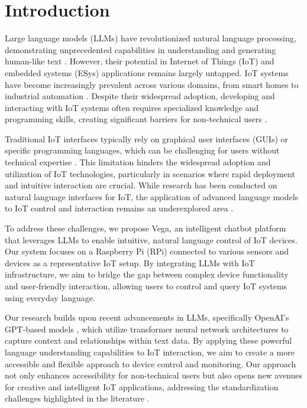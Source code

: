 \documentclass{ieeeaccess}
\begin{document}
\maketitle

\section{Introduction}
\label{sec:introduction}

Large language models (LLMs) have revolutionized natural language processing, demonstrating unprecedented capabilities in understanding and generating human-like text \cite{10.1145/3641289}. However, their potential in Internet of Things (IoT) and embedded systems (ESys) applications remains largely untapped. IoT systems have become increasingly prevalent across various domains, from smart homes to industrial automation \cite{8355897}. Despite their widespread adoption, developing and interacting with IoT systems often requires specialized knowledge and programming skills, creating significant barriers for non-technical users \cite{10.1145/3447526.3472036}.

Traditional IoT interfaces typically rely on graphical user interfaces (GUIs) or specific programming languages, which can be challenging for users without technical expertise \cite{10.1145/3447526.3472036}. This limitation hinders the widespread adoption and utilization of IoT technologies, particularly in scenarios where rapid deployment and intuitive interaction are crucial. While research has been conducted on natural language interfaces for IoT, the application of advanced language models to IoT control and interaction remains an underexplored area \cite{KASSAB2020102663}.

To address these challenges, we propose Vega, an intelligent chatbot platform that leverages LLMs to enable intuitive, natural language control of IoT devices. Our system focuses on a Raspberry Pi (RPi) connected to various sensors and devices as a representative IoT setup. By integrating LLMs with IoT infrastructure, we aim to bridge the gap between complex device functionality and user-friendly interaction, allowing users to control and query IoT systems using everyday language.

Our research builds upon recent advancements in LLMs, specifically OpenAI's GPT-based models \cite{OpenAI_GPT}, which utilize transformer neural network architectures to capture context and relationships within text data. By applying these powerful language understanding capabilities to IoT interaction, we aim to create a more accessible and flexible approach to device control and monitoring. Our approach not only enhances accessibility for non-technical users but also opens new avenues for creative and intelligent IoT applications, addressing the standardization challenges highlighted in the literature \cite{7821686}.
\end{document}
